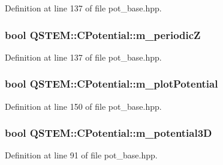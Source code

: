 Definition at line 137 of file pot\-\_\-base.\-hpp.

\hypertarget{class_q_s_t_e_m_1_1_c_potential_afc3946ab6457d37286dd9feed1eb6dd2}{
\subsubsection[{m\-\_\-periodic\-Z}]{\setlength{\rightskip}{0pt plus 5cm}bool Q\-S\-T\-E\-M\-::\-C\-Potential\-::m\-\_\-periodic\-Z\hspace{0.3cm}{\ttfamily [protected]}}}\label{class_q_s_t_e_m_1_1_c_potential_afc3946ab6457d37286dd9feed1eb6dd2}


Definition at line 137 of file pot\-\_\-base.\-hpp.

\hypertarget{class_q_s_t_e_m_1_1_c_potential_a9a31efee8d548970ef9bfe8a8952ece5}{
\subsubsection[{m\-\_\-plot\-Potential}]{\setlength{\rightskip}{0pt plus 5cm}bool Q\-S\-T\-E\-M\-::\-C\-Potential\-::m\-\_\-plot\-Potential\hspace{0.3cm}{\ttfamily [protected]}}}\label{class_q_s_t_e_m_1_1_c_potential_a9a31efee8d548970ef9bfe8a8952ece5}


Definition at line 150 of file pot\-\_\-base.\-hpp.

\hypertarget{class_q_s_t_e_m_1_1_c_potential_ac0c18b56f08fb41accc58ceedd53db1b}{
\subsubsection[{m\-\_\-potential3\-D}]{\setlength{\rightskip}{0pt plus 5cm}bool Q\-S\-T\-E\-M\-::\-C\-Potential\-::m\-\_\-potential3\-D}}\label{class_q_s_t_e_m_1_1_c_potential_ac0c18b56f08fb41accc58ceedd53db1b}


Definition at line 91 of file pot\-\_\-base.\-hpp.

